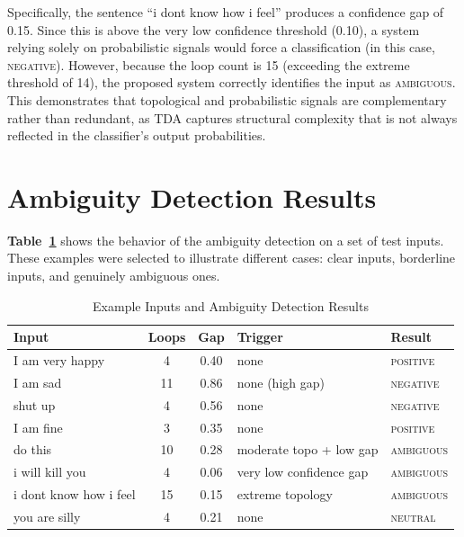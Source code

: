 Specifically, the sentence ``i dont know how i feel'' produces a confidence gap of 0.15. Since this is above the very low confidence threshold (0.10), a system relying solely on probabilistic signals would force a classification (in this case, \textsc{negative}). However, because the loop count is 15 (exceeding the extreme threshold of 14), the proposed system correctly identifies the input as \textsc{ambiguous}. This demonstrates that topological and probabilistic signals are complementary rather than redundant, as TDA captures structural complexity that is not always reflected in the classifier's output probabilities.

\section{Ambiguity Detection Results}

\textbf{Table~\ref{tab:ambigresults}} shows the behavior of the ambiguity detection on a set of test
inputs. These examples were selected to illustrate different cases: clear inputs, borderline
inputs, and genuinely ambiguous ones.

\begin{table}[H]
\centering
\caption{Example Inputs and Ambiguity Detection Results}
\label{tab:ambigresults}
\begin{tabular}{lccll}
\toprule
\textbf{Input} & \textbf{Loops} & \textbf{Gap} & \textbf{Trigger} & \textbf{Result} \\
\midrule
I am very happy          & 4  & 0.40 & none                          & \textsc{positive}  \\
I am sad                 & 11 & 0.86 & none (high gap)               & \textsc{negative}  \\
shut up                  & 4  & 0.56 & none                          & \textsc{negative}  \\
I am fine                & 3  & 0.35 & none                          & \textsc{positive}  \\
do this                  & 10 & 0.28 & moderate topo + low gap       & \textsc{ambiguous} \\
i will kill you          & 4  & 0.06 & very low confidence gap       & \textsc{ambiguous} \\
i dont know how i feel   & 15 & 0.15 & extreme topology              & \textsc{ambiguous} \\
you are silly            & 4  & 0.21 & none                          & \textsc{neutral}   \\
\bottomrule
\end{tabular}
\end{table}

